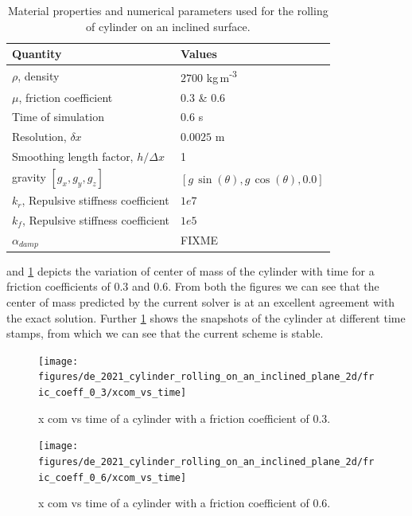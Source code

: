 \documentclass[preprint,12pt]{elsarticle}
\begin{document}
\begin{table}[!ht]
  \centering
  \begin{tabular}[!ht]{ll}
    \toprule
    Quantity & Values\\
    \midrule
    $\rho$, density & $2700$ kg\,m\textsuperscript{-3} \\
    $\mu$, friction coefficient & $0.3$ \& $0.6$ \\
    Time of simulation & $0.6$ s \\
    Resolution, $\delta x$ & $0.0025$ m\\
    Smoothing length factor, $h/\Delta x$ & 1\\
    gravity $[g_x, g_y, g_z]$ & $[g\,\sin(\theta), g\,\cos(\theta), 0.0]$\\
    $k_r$, Repulsive stiffness coefficient & $1e7$ \\
    $k_f$, Repulsive stiffness coefficient & $1e5$ \\
    $\alpha_{damp}$ & FIXME\\
    \bottomrule
  \end{tabular}
  \caption{Material properties and numerical parameters used for the rolling
    of cylinder on an inclined surface.}%
  \label{tab:circular-body-rolling-params}
\end{table}

 and
\cref{fig:cylinder-xcom-vs-time-fric-0-3} depicts the variation of center of
mass of the cylinder with time for a friction coefficients of $0.3$ and $0.6$.
From both the figures we can see that the center of mass predicted by the
current solver is at an excellent agreement with the exact solution. Further
 \cref{fig:cylinder-xcom-vs-time-fric-0-3} shows
the snapshots of the cylinder at different time stamps, from which we can see
that the current scheme is stable.

\begin{figure}[!htpb]
  \centering
  \texttt{[image: figures/de\_2021\_cylinder\_rolling\_on\_an\_inclined\_plane\_2d/fric\_coeff\_0\_3/xcom\_vs\_time]}
  \caption{x com vs time of a cylinder with a friction coefficient of $0.3$.}
\label{fig:cylinder-xcom-vs-time-fric-0-3}
\end{figure}

\begin{figure}[!htpb]
  \centering
  \texttt{[image: figures/de\_2021\_cylinder\_rolling\_on\_an\_inclined\_plane\_2d/fric\_coeff\_0\_6/xcom\_vs\_time]}
  \caption{x com vs time of a cylinder with a friction coefficient of $0.6$.}
\label{fig:cylinder-xcom-vs-time-fric-0-6}
\end{figure}
\end{document}
